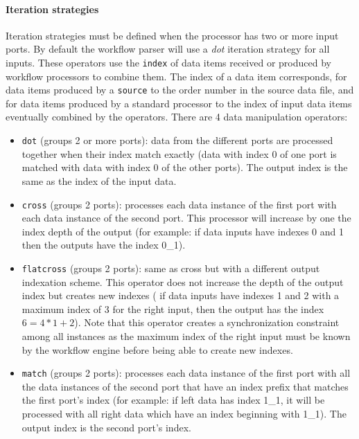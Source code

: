 \paragraph{Iteration strategies} 
Iteration strategies must be defined when the processor has two or more input
ports. By default the workflow parser will use a \textit{dot} iteration
strategy for all inputs. These operators use the \texttt{index} of data items
received or produced by workflow processors to combine them. The index of a
data item corresponds, for data items produced by a \texttt{source} to the
order number in the source data file, and for data items produced by a standard
processor to the index of input data items eventually combined by the
operators.  There are 4 data manipulation operators:
\begin{itemize}
\item \texttt{dot} (groups 2 or more ports): data from the different
  ports are processed together when their index match exactly (data
  with index 0 of one port is matched with data with index 0 of the
  other ports). The output index is the same as the index of the input
  data.
\item \texttt{cross} (groups 2 ports): processes each data instance of
  the first port with each data instance of the second port. This
  processor will increase by one the index depth of the output (for
  example: if data inputs have indexes 0 and 1 then the outputs have
  the index 0\_1).
\item \texttt{flatcross} (groups 2 ports): same as cross but with a
  different output indexation scheme. This operator does not increase
  the depth of the output index but creates new indexes (\eg
  if data inputs have indexes 1 and 2 with a maximum index of 3 for
  the right input, then the output has the index $6 = 4*1 + 2$). Note
  that this operator creates a synchronization constraint among all
  instances as the maximum index of the right input must be known by
  the workflow engine before being able to create new indexes.
\item \texttt{match} (groups 2 ports): processes each data instance of
  the first port with all the data instances of the second port that
  have an index prefix that matches the first port's index (for
  example: if left data has index 1\_1, it will be processed with all
  right data which have an index beginning with 1\_1). The output
  index is the second port's index.
\end{itemize}


